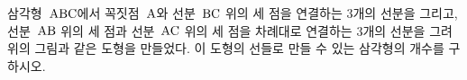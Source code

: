 \noindent\begin{minipage}[t]{0.58\linewidth}\vspace{0pt}\raggedright 삼각형~$\mathrm{ABC}$에서 꼭짓점~$\mathrm{A}$와 선분~$\mathrm{BC}$ 위의 세 점을 연결하는 3개의 선분을 그리고, 선분~$\mathrm{AB}$ 위의 세 점과 선분~$\mathrm{AC}$ 위의 세 점을 차례대로 연결하는 3개의 선분을 그려 위의 그림과 같은 도형을 만들었다. 이 도형의 선들로 만들 수 있는 삼각형의 개수를 구하시오.\end{minipage}\hfill\begin{minipage}[t]{0.4\linewidth}\vspace{0pt}\centering \resizebox{\ifdim\width>\linewidth\linewidth\else\width\fi}{!}{}\end{minipage}\par
